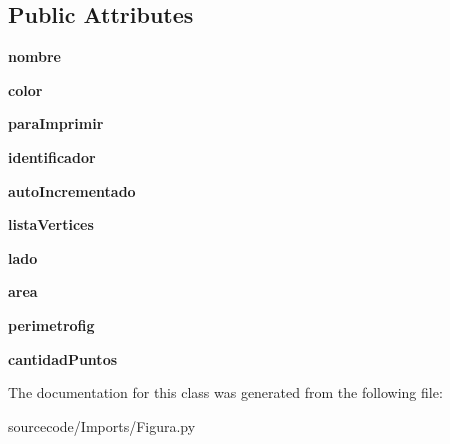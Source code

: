 \subsection*{Public Attributes}
\begin{DoxyCompactItemize}
\item 
\mbox{\label{class_imports_1_1_figura_1_1_figura_add314c416e15c134067c707bf255b99a}} 
{\bfseries nombre}
\item 
\mbox{\label{class_imports_1_1_figura_1_1_figura_a4753c4a2866bef351a81fc09a20b247a}} 
{\bfseries color}
\item 
\mbox{\label{class_imports_1_1_figura_1_1_figura_af5c3524504133cc691658fc423c91c8d}} 
{\bfseries para\+Imprimir}
\item 
\mbox{\label{class_imports_1_1_figura_1_1_figura_a645cf8d8d74cbefbb3e4abe82990f173}} 
{\bfseries identificador}
\item 
\mbox{\label{class_imports_1_1_figura_1_1_figura_aec730795d9bb7daee9fd62521c2e0236}} 
{\bfseries auto\+Incrementado}
\item 
\mbox{\label{class_imports_1_1_figura_1_1_figura_a1a045513cb4f6b45122ae94085418817}} 
{\bfseries lista\+Vertices}
\item 
\mbox{\label{class_imports_1_1_figura_1_1_figura_a954959dd00d56582db4c5b40336089df}} 
{\bfseries lado}
\item 
\mbox{\label{class_imports_1_1_figura_1_1_figura_af8859e344f1e43aa6124d167d821a3b5}} 
{\bfseries area}
\item 
\mbox{\label{class_imports_1_1_figura_1_1_figura_ab7b5a1a11f492e83207695daf37b1418}} 
{\bfseries perimetrofig}
\item 
\mbox{\label{class_imports_1_1_figura_1_1_figura_a08b1b4efe89a1729df093407db6739b1}} 
{\bfseries cantidad\+Puntos}
\end{DoxyCompactItemize}


The documentation for this class was generated from the following file\+:\begin{DoxyCompactItemize}
\item 
sourcecode/\+Imports/Figura.\+py\end{DoxyCompactItemize}
